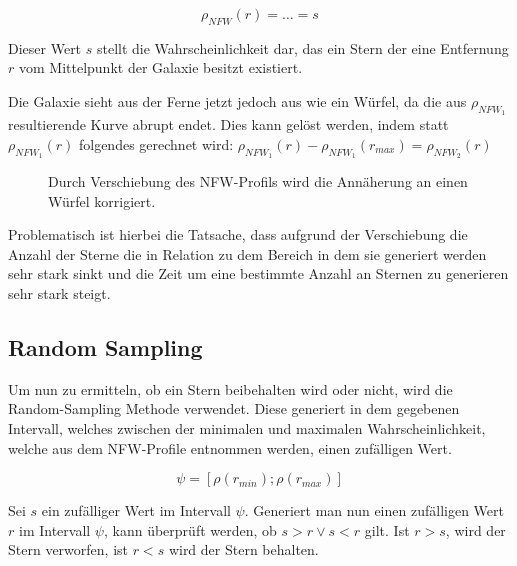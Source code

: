 \begin{equation}
\rho_{NFW}(r) = \dots = s
\end{equation}

Dieser Wert \( s \) stellt die Wahrscheinlichkeit dar, das ein Stern der
eine Entfernung \( r \) vom Mittelpunkt der Galaxie besitzt existiert.

Die Galaxie sieht aus der Ferne jetzt jedoch aus wie ein Würfel, da die aus \(
\rho_{NFW_{1}} \) resultierende Kurve abrupt endet. Dies kann gelöst werden,
indem statt \( \rho_{NFW_{1}}(r) \) folgendes gerechnet wird: \(
\rho_{NFW_{1}}(r) - \rho_{NFW_{1}}(r_{max}) = \rho_{NFW_{2}}(r)\)

\begin{figure}
\centering
{}
\caption{Durch Verschiebung des NFW-Profils wird die Annäherung an einen Würfel korrigiert.}
\end{figure}

Problematisch ist hierbei die Tatsache, dass aufgrund der Verschiebung die
Anzahl der Sterne die in Relation zu dem Bereich in dem sie generiert werden
sehr stark sinkt und die Zeit um eine bestimmte Anzahl an Sternen zu generieren
sehr stark steigt.

\subsection{Random Sampling} \label{subsec:random_sampling}

Um nun zu ermitteln, ob ein Stern beibehalten wird oder nicht, wird die
Random-Sampling Methode verwendet. Diese generiert in dem gegebenen Intervall,
welches zwischen der minimalen und maximalen Wahrscheinlichkeit, welche aus dem
NFW-Profile entnommen werden, einen zufälligen Wert.

\begin{equation}\label{range:psi}
\psi = [ \rho(r_{min}); \rho(r_{max}) ]
\end{equation}

Sei \( s \) ein zufälliger Wert im Intervall \( \psi \). Generiert man nun
einen zufälligen Wert \( r \) im Intervall \( \psi \), kann überprüft werden, ob \( s
> r \lor s < r \) gilt. Ist \( r
> s \), wird der Stern verworfen, ist \( r < s \) wird der Stern behalten.

